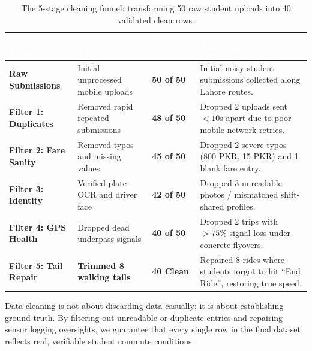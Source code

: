 \documentclass[10pt, a4paper]{article}
\begin{document}
\begin{table}[h!]
\centering
\footnotesize
\begin{tabularx}{\textwidth}{|l|l|>{\centering\arraybackslash}p{2.2cm}|X|}
\hline
\rowcolor{navyblue}\textcolor{white}{\textbf{Cleaning Phase}} & \textcolor{white}{\textbf{Filter / Action Taken}} & \textcolor{white}{\textbf{Records Kept}} & \textcolor{white}{\textbf{Plain English Reason}} \\ \hline
\rowcolor{white}\textbf{Raw Submissions} & Initial unprocessed mobile uploads & \textbf{50 of 50} & Initial noisy student submissions collected along Lahore routes. \\ \hline
\rowcolor{lightgray}\textbf{Filter 1: Duplicates} & Removed rapid repeated submissions & \textbf{48 of 50} & Dropped 2 uploads sent \(< 10\)s apart due to poor mobile network retries. \\ \hline
\rowcolor{white}\textbf{Filter 2: Fare Sanity} & Removed typos and missing values & \textbf{45 of 50} & Dropped 2 severe typos (800 PKR, 15 PKR) and 1 blank fare entry. \\ \hline
\rowcolor{lightgray}\textbf{Filter 3: Identity} & Verified plate OCR and driver face & \textbf{42 of 50} & Dropped 3 unreadable photos / mismatched shift-shared profiles. \\ \hline
\rowcolor{white}\textbf{Filter 4: GPS Health} & Dropped dead underpass signals & \textbf{40 of 50} & Dropped 2 trips with \(> 75\%\) signal loss under concrete flyovers. \\ \hline
\rowcolor{softteal}\textbf{Filter 5: Tail Repair} & \textbf{Trimmed 8 walking tails} & \textbf{40 Clean} & Repaired 8 rides where students forgot to hit ``End Ride'', restoring true speed. \\ \hline
\end{tabularx}
\caption{\small The 5-stage cleaning funnel: transforming 50 raw student uploads into 40 validated clean rows.}
\end{table}

\begin{takeawaybox}
Data cleaning is not about discarding data casually; it is about establishing ground truth. By filtering out unreadable or duplicate entries and repairing sensor logging oversights, we guarantee that every single row in the final dataset reflects real, verifiable student commute conditions.
\end{takeawaybox}

\newpage

\end{document}

